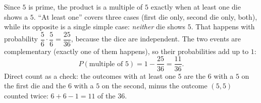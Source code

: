 Since $5$ is prime, the product is a multiple of $5$ exactly when at least one die shows a $5$. ``At least one'' covers three cases (first die only, second die only, both), while its opposite is a single simple case: \emph{neither} die shows $5$. That happens with probability $\dfrac{5}{6}\cdot\dfrac{5}{6}=\dfrac{25}{36}$, because the dice are independent. The two events are complementary (exactly one of them happens), so their probabilities add up to $1$:
\[
P(\text{multiple of }5)=1-\dfrac{25}{36}=\boxed{\dfrac{11}{36}}.
\]
Direct count as a check: the outcomes with at least one $5$ are the $6$ with a $5$ on the first die and the $6$ with a $5$ on the second, minus the outcome $(5,5)$ counted twice: $6+6-1=11$ of the $36$.
